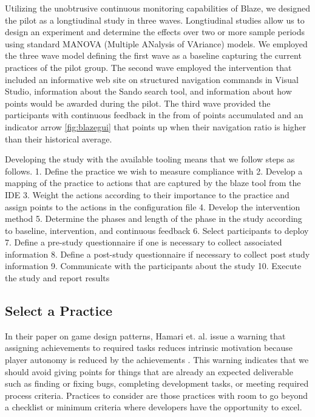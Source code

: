 \documentclass{sig-alternate}
\begin{document}
Utilizing the unobtrusive continuous monitoring capabilities of Blaze, we designed the pilot as a longtiudinal study in three waves.  Longtiudinal studies allow us to design an experiment and determine the effects over two or more sample periods using standard MANOVA (Multiple ANalysis of VAriance) models. \cite{longitudinalbook}  We employed the three wave model defining the first wave as a baseline capturing the current practices of the pilot group.  The second wave employed the intervention that included an informative web site on structured navigation commands in Visual Studio, information about the Sando search tool, and information about how points would be awarded during the pilot.  The third wave provided the participants with continuous feedback in the from of points accumulated and an indicator arrow \ref{fig:blazegui} that points up when their navigation ratio is higher than their historical average.  

Developing the study with the available tooling means that we follow steps as follows.
1. Define the practice we wish to measure compliance with
2. Develop a mapping of the practice to actions that are captured by the blaze tool from the IDE
3. Weight the actions according to their importance to the practice and assign points to the actions in the configuration file
4. Develop the intervention method
5. Determine the phases and length of the phase in the study according to baseline, intervention, and continuous feedback
6. Select participants to deploy
7. Define a pre-study questionnaire if one is necessary to collect associated information
8. Define a post-study questionnaire if necessary to collect post study information
9. Communicate with the participants about the study
10. Execute the study and report results

\subsection{Select a Practice}
In their paper on game design patterns, Hamari et. al. issue a warning that assigning achievements to required tasks reduces intrinsic motivation because player autonomy is reduced by the achievements \cite{wbsnipes:Hamari2011Framework} .  This warning indicates that we should avoid giving points for things that are already an expected deliverable such as finding or fixing bugs, completing development tasks, or meeting required process criteria.  Practices to consider are those practices with room to go beyond a checklist or minimum criteria where developers have the opportunity to excel.
\end{document}
